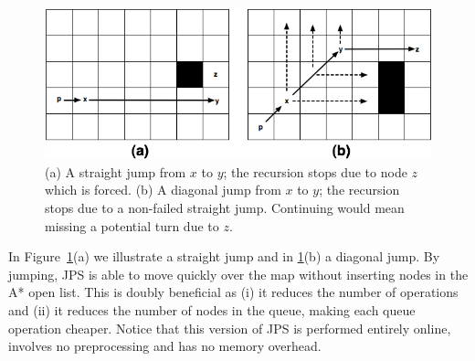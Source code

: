 \begin{figure}[tb]
       \begin{center}
		   \includegraphics[width=0.95\columnwidth]
			{diagrams/jumping.png}
       \end{center}
	\vspace{-3pt}
       \caption{(a) A straight jump from $x$ to $y$; the recursion stops due to node $z$ which is forced.
(b) A diagonal jump from $x$ to $y$; the recursion stops due to a non-failed straight jump. Continuing 
would mean missing a potential turn due to $z$.}
       \label{fig:jumping}
\end{figure}

In Figure~\ref{fig:jumping}(a) we illustrate a straight jump and in \ref{fig:jumping}(b) a diagonal jump. 
By jumping, JPS is able to move quickly over the map 
without inserting nodes in the A* open list.
This is doubly beneficial as (i) it reduces the number of operations 
and (ii) it reduces the number of nodes in the queue, 
making each queue operation cheaper.  
Notice that this version of JPS is performed entirely online, involves no preprocessing and has no memory overhead.  

